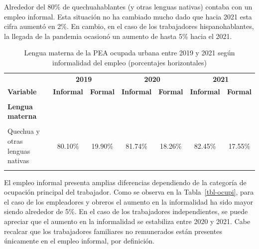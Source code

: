\documentclass[
  letterpaper,
  12pt,
  oneside,
  spanish,
  doublespacing,
  headsepline,
  parskip]{MastersDoctoralThesis}
\begin{document}
Alrededor del 80\% de quechuahablantes (y otras lenguas nativas) contaba
con un empleo informal. Esta situación no ha cambiado mucho dado que
hacia 2021 esta cifra aumentó en 2\%. En cambio, en el caso de los
trabajadores hispanohablantes, la llegada de la pandemia ocasionó un
aumento de hasta 5\% hacia el 2021.

\hypertarget{tbl-leng}{}
\begin{table}[H]
\caption{\label{tbl-leng}Lengua materna de la PEA ocupada urbana entre 2019 y 2021 según
informalidad del empleo (porcentajes horizontales) }\tabularnewline

\centering\begingroup\fontsize{10}{12}\selectfont

\begin{tabular}{lcccccc}
\toprule
\multicolumn{1}{c}{ } & \multicolumn{2}{c}{\textbf{2019}} & \multicolumn{2}{c}{\textbf{2020}} & \multicolumn{2}{c}{\textbf{2021}} \\
\cmidrule(l{3pt}r{3pt}){2-3} \cmidrule(l{3pt}r{3pt}){4-5} \cmidrule(l{3pt}r{3pt}){6-7}
\textbf{Variable} & \textbf{Informal} & \textbf{Formal} & \textbf{Informal} & \textbf{Formal} & \textbf{Informal} & \textbf{Formal}\\
\midrule
\cellcolor{gray!6}{\textbf{Nacional}} & \cellcolor{gray!6}{66.40\%} & \cellcolor{gray!6}{33.60\%} & \cellcolor{gray!6}{68.42\%} & \cellcolor{gray!6}{31.58\%} & \cellcolor{gray!6}{71.41\%} & \cellcolor{gray!6}{28.59\%}\\
\textbf{Lengua materna} &  &  &  &  &  & \\
\cellcolor{gray!6}{Castellano} & \cellcolor{gray!6}{64.60\%} & \cellcolor{gray!6}{35.40\%} & \cellcolor{gray!6}{66.01\%} & \cellcolor{gray!6}{33.99\%} & \cellcolor{gray!6}{69.80\%} & \cellcolor{gray!6}{30.20\%}\\
Quechua y otras lenguas nativas & 80.10\% & 19.90\% & 81.74\% & 18.26\% & 82.45\% & 17.55\%\\
\cellcolor{gray!6}{Otros} & \cellcolor{gray!6}{60.12\%} & \cellcolor{gray!6}{39.88\%} & \cellcolor{gray!6}{82.54\%} & \cellcolor{gray!6}{17.46\%} & \cellcolor{gray!6}{70.81\%} & \cellcolor{gray!6}{29.19\%}\\
\bottomrule
\end{tabular}
\endgroup{}
\end{table}

El empleo informal presenta amplias diferencias dependiendo de la
categoría de ocupación principal del trabajador. Como se observa en la
Tabla~\ref{tbl-ocupi}, para el caso de los empleadores y obreros el
aumento en la informalidad ha sido mayor siendo alrededor de 5\%. En el
caso de los trabajadores independientes, se puede apreciar que el
aumento en la informalidad se estabiliza entre 2020 y 2021. Cabe
recalcar que los trabajadores familiares no remunerados están presentes
únicamente en el empleo informal, por definición.
\end{document}
